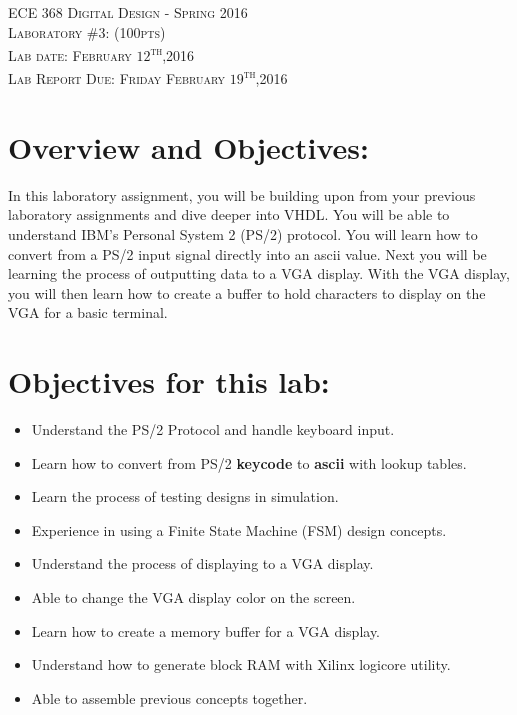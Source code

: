 \documentclass{article}
\begin{document}
\begin{center}
\textsc{\huge ECE 368 Digital Design - Spring 2016}\\[1cm]
\textsc{{\LARGE Laboratory \#3: (100pts)}}\\[0.5cm]
\textsc{\Large Lab date: February $12$\textsuperscript{th},2016}\\[0.5cm]
\textsc{\Large Lab Report Due: Friday February $19$\textsuperscript{th},2016}\\[1cm]
\end{center}

\section{Overview and Objectives:}
In this laboratory assignment, you will be building upon from your previous laboratory assignments and dive deeper into VHDL. You will be able to understand IBM's Personal System 2 (PS/2) protocol. You will learn how to convert from a PS/2 input signal directly into an ascii value. Next you will be learning the process of outputting data to a VGA display. With the VGA display, you will then learn how to create a buffer to hold characters to display on the VGA for a basic terminal.

\section{Objectives for this lab:}
\begin{itemize}
  \item Understand the PS/2 Protocol and handle keyboard input.
  \item Learn how to convert from PS/2 \textbf{keycode} to \textbf{ascii} with lookup tables.
  \item Learn the process of testing designs in simulation.
  \item Experience in using a Finite State Machine (FSM) design concepts.
  \item Understand the process of displaying to a VGA display.
  \item Able to change the VGA display color on the screen.
  \item Learn how to create a memory buffer for a VGA display.
  \item Understand how to generate block RAM with Xilinx\textsuperscript{\textregistered} logicore utility.
  \item Able to assemble previous concepts together.
\end{itemize}
\end{document}
